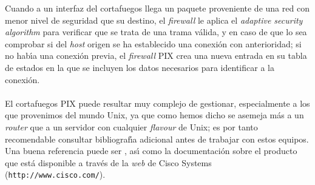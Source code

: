 Cuando a un interfaz del cortafuegos llega un paquete proveniente de una red 
con menor nivel de seguridad que su destino, el {\it firewall} le aplica el 
{\it adaptive security algorithm} para verificar que se trata de una trama 
v\'alida, y en caso de que lo sea comprobar si del {\it host} origen se ha 
establecido una conexi\'on con anterioridad; si no hab\'{\i}a una conexi\'on 
previa, el {\it firewall} PIX crea una nueva entrada en su tabla de estados en 
la que se incluyen los datos necesarios para identificar a la conexi\'on.\\
\\El cortafuegos PIX puede resultar muy complejo de gestionar, especialmente a
los que provenimos del mundo Unix, ya que como hemos dicho se asemeja m\'as a
un {\it router} que a un servidor con cualquier {\it flavour} de Unix; es por
tanto recomendable consultar bibliograf\'{\i}a adicional antes de trabajar con
estos equipos. Una buena referencia puede ser \cite{kn:cap01}, as\'{\i} como
la documentaci\'on sobre el producto que est\'a disponible a trav\'es de la
{\it web} de Cisco Systems ({\tt http://www.cisco.com/}).
